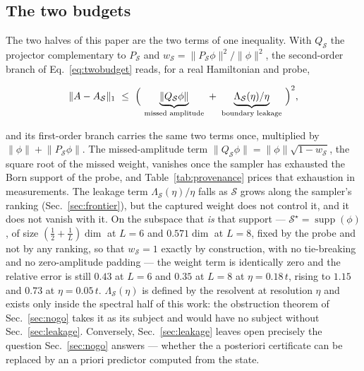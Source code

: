 \subsection{The two budgets}\label{sec:method:budgets}
The two halves of this paper are the two terms of one inequality. With $Q_{\mathcal S}$ the projector
complementary to $P_{\mathcal S}$ and
$w_{\mathcal S}=\lVert P_{\mathcal S}\phi\rVert^{2}/\lVert\phi\rVert^{2}$, the second-order branch of
Eq.~\eqref{eq:twobudget} reads, for a real Hamiltonian and probe,
\begin{widetext}
\begin{equation*}
\lVert A-A_{\mathcal S}\rVert_{1}\ \le\ \Bigl(\ \underbrace{\lVert Q_{\mathcal S}\phi\rVert}_{\text{missed amplitude}}
\ +\ \underbrace{\Lambda_{\mathcal S}(\eta)/\eta}_{\text{boundary leakage}}\ \Bigr)^{2},
\end{equation*}
\end{widetext}
and its first-order branch carries the same two terms once, multiplied by $\lVert\phi\rVert+\lVert P_{\mathcal S}\phi\rVert$.
The missed-amplitude term $\lVert Q_{\mathcal S}\phi\rVert=\lVert\phi\rVert\sqrt{1-w_{\mathcal S}}$, the square root of the missed weight, vanishes once the sampler has exhausted the Born support of the probe, and Table~\ref{tab:provenance} prices that exhaustion in measurements. The leakage term $\Lambda_{\mathcal S}(\eta)/\eta$ falls as $\mathcal S$ grows along the sampler's ranking (Sec.~\ref{sec:frontier}), but the captured weight does not control it, and it does not vanish with it. On the subspace that \emph{is} that support --- $\mathcal S^{\star}=\operatorname{supp}(\phi)$, of
size $(\tfrac12+\tfrac1L)\dim$ at $L=6$ and $0.571\dim$ at $L=8$, fixed by the probe and not by any ranking, so that
$w_{\mathcal S}=1$ exactly by construction, with no tie-breaking and no zero-amplitude padding --- the
weight term is identically zero and the relative error is still $0.43$ at $L=6$ and $0.35$ at $L=8$ at $\eta=0.18\,t$, rising to $1.15$ and $0.73$ at $\eta=0.05\,t$. $\Lambda_{\mathcal S}(\eta)$ is defined
by the resolvent at resolution $\eta$ and exists only inside the spectral half of this work: the
obstruction theorem of Sec.~\ref{sec:nogo} takes it as its subject and would have no subject without
Sec.~\ref{sec:leakage}. Conversely, Sec.~\ref{sec:leakage} leaves open precisely the question
Sec.~\ref{sec:nogo} answers --- whether the a posteriori certificate can be replaced by an a priori
predictor computed from the state.
